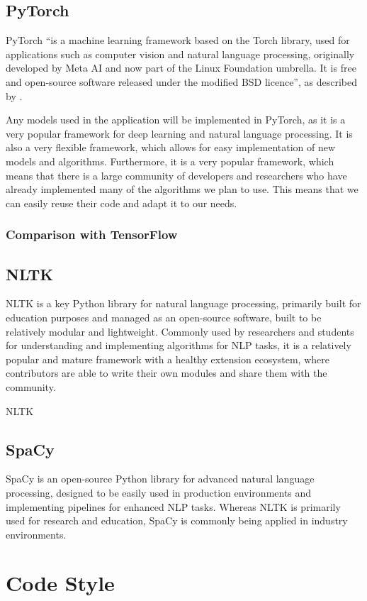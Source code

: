 \subsection{PyTorch}
PyTorch ``is a machine learning framework based on the Torch library, used for applications such as computer vision and natural language processing, originally developed by Meta AI and now part of the Linux Foundation umbrella. It is free and open-source software released under the modified BSD licence'', as described by \cite{enwiki:1146375871}.

Any models used in the application will be implemented in PyTorch, as it is a very popular framework for deep learning and natural language processing. It is also a very flexible framework, which allows for easy implementation of new models and algorithms. Furthermore, it is a very popular framework, which means that there is a large community of developers and researchers who have already implemented many of the algorithms we plan to use. This means that we can easily reuse their code and adapt it to our needs.
\subsubsection*{\textbf{Comparison with TensorFlow}}
\subsection{NLTK}
NLTK is a key Python library for natural language processing, primarily built for education purposes and managed as an open-source software, built to be relatively modular and lightweight. Commonly used by researchers and students for understanding and implementing algorithms for NLP tasks, it is a relatively popular and mature framework with a healthy extension ecosystem, where contributors are able to write their own modules and share them with the community.  

NLTK 
\subsection{SpaCy}
SpaCy is an open-source Python library for advanced natural language processing, designed to be easily used in production environments and implementing pipelines for enhanced NLP tasks. Whereas NLTK is primarily used for research and education, SpaCy is commonly being applied in industry environments. 

\section{Code Style}
